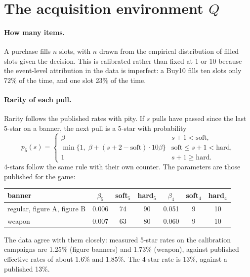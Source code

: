 \documentclass[11pt]{article}
\begin{document}
\section{The acquisition environment \texorpdfstring{$Q$}{Q}}\label{sec:env}

\paragraph{How many items.} A purchase fills $n$ slots, with $n$ drawn from the
empirical distribution of filled slots given the decision. This is calibrated
rather than fixed at 1 or 10 because the event-level attribution in the data is
imperfect: a Buy10 fills ten slots only 72\% of the time, and one slot 23\% of
the time.

\paragraph{Rarity of each pull.} Rarity follows the published rates with pity.
If $s$ pulls have passed since the last 5-star on a banner, the next pull is a
5-star with probability
\begin{equation}
p_5(s) =
\begin{cases}
\beta & s+1 < \text{soft},\\
\min\{1,\; \beta + (s+2-\text{soft})\cdot 10\beta\} & \text{soft} \le s+1 < \text{hard},\\
1 & s+1 \ge \text{hard}.
\end{cases}
\end{equation}
4-stars follow the same rule with their own counter. The parameters are those
published for the game:

\begin{center}
\small
\begin{tabular}{lcccccc}
\toprule
banner & $\beta_5$ & soft$_5$ & hard$_5$ & $\beta_4$ & soft$_4$ & hard$_4$\\
\midrule
regular, figure A, figure B & 0.006 & 74 & 90 & 0.051 & 9 & 10\\
weapon & 0.007 & 63 & 80 & 0.060 & 9 & 10\\
\bottomrule
\end{tabular}
\end{center}

\noindent The data agree with them closely: measured 5-star rates on the
calibration campaigns are 1.25\% (figure banners) and 1.73\% (weapon), against
published effective rates of about 1.6\% and 1.85\%. The 4-star rate is 13\%,
against a published 13\%.
\end{document}
